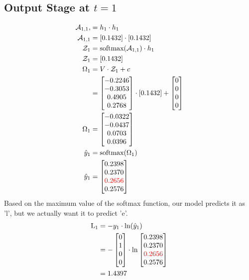 \documentclass{article}
\begin{document}
\subsection*{Output Stage at $t=1$}
\begin{align*}
\mathcal{A}_{1,1},&= h_1 \cdot h_1 \\
\mathcal{A}_{1,1} &= [0.1432] \cdot [0.1432] \\
\mathcal{Z}_1 &= \text{softmax}(\mathcal{A}_{1,1}) \cdot h_1 \\
\mathcal{Z}_1 &= [0.1432] \\
\Omega_1 &= V \cdot \mathcal{Z}_1 + c \\
 &= \begin{bmatrix} -0.2246 \\ -0.3053 \\ 0.4905 \\ 0.2768 \end{bmatrix} \cdot [0.1432] + \begin{bmatrix} 0 \\ 0 \\ 0 \\ 0 \end{bmatrix} \\
\Omega_1 &= \begin{bmatrix} -0.0322 \\ -0.0437 \\ 0.0703 \\ 0.0396 \end{bmatrix} \\
\hat{y}_1 &= \text{softmax}(\Omega_1) \\
\hat{y}_1 &= \begin{bmatrix} 0.2398 \\ 0.2370 \\ \textcolor{red}{0.2656} \\ 0.2576 \end{bmatrix} 
\end{align*}
Based on the maximum value of the softmax function, our model predicts it as 'l', but we actually want it to predict 'e'.
\begin{align*}
    \text{L}_{1} & = -y_1 \cdot \ln(\hat{y}_1) \\
    &=-\begin{bmatrix} 0 \\ 1 \\ 0 \\ 0 \end{bmatrix} \cdot \ln{\begin{bmatrix} 0.2398 \\ 0.2370 \\ \textcolor{red}{0.2656} \\ 0.2576 \end{bmatrix}}\\
    &=1.4397
\end{align*}
\end{document}
